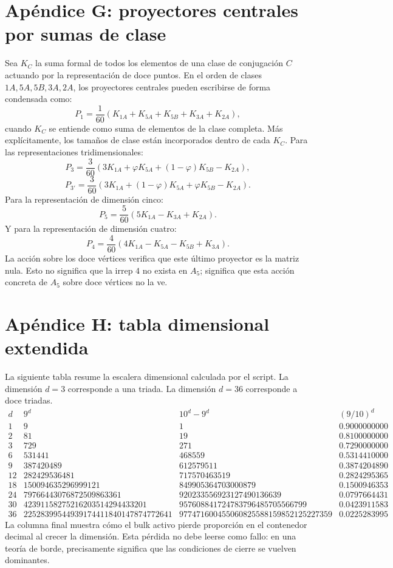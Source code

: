 \documentclass[11pt,a4paper]{article}
\begin{document}
\section{Apéndice G: proyectores centrales por sumas de clase}
Sea $K_C$ la suma formal de todos los elementos de una clase de conjugación $C$ actuando por la representación de doce puntos. En el orden de clases $1A,5A,5B,3A,2A$, los proyectores centrales pueden escribirse de forma condensada como:
\[
P_1=\frac1{60}(K_{1A}+K_{5A}+K_{5B}+K_{3A}+K_{2A}),
\]
cuando $K_C$ se entiende como suma de elementos de la clase completa. Más explícitamente, los tamaños de clase están incorporados dentro de cada $K_C$.
Para las representaciones tridimensionales:
\[
P_3=\frac3{60}\left(3K_{1A}+\varphi K_{5A}+(1-\varphi)K_{5B}-K_{2A}\right),
\]
\[
P_{3'}=\frac3{60}\left(3K_{1A}+(1-\varphi)K_{5A}+\varphi K_{5B}-K_{2A}\right).
\]
Para la representación de dimensión cinco:
\[
P_5=\frac5{60}\left(5K_{1A}-K_{3A}+K_{2A}\right).
\]
Y para la representación de dimensión cuatro:
\[
P_4=\frac4{60}\left(4K_{1A}-K_{5A}-K_{5B}+K_{3A}\right).
\]
La acción sobre los doce vértices verifica que este último proyector es la matriz nula. Esto no significa que la irrep $4$ no exista en $A_5$; significa que esta acción concreta de $A_5$ sobre doce vértices no la ve.

\section{Apéndice H: tabla dimensional extendida}
La siguiente tabla resume la escalera dimensional calculada por el script. La dimensión $d=3$ corresponde a una triada. La dimensión $d=36$ corresponde a doce triadas.
\[
\begin{array}{r|r|r|r}
 d & 9^d & 10^d-9^d & (9/10)^d\\
\hline
 1 & 9 & 1 & 0.9000000000\\
 2 & 81 & 19 & 0.8100000000\\
 3 & 729 & 271 & 0.7290000000\\
 6 & 531441 & 468559 & 0.5314410000\\
 9 & 387420489 & 612579511 & 0.3874204890\\
 12 & 282429536481 & 717570463519 & 0.2824295365\\
 18 & 150094635296999121 & 849905364703000879 & 0.1500946353\\
 24 & 79766443076872509863361 & 920233556923127490136639 & 0.0797664431\\
 30 & 42391158275216203514294433201 & 957608841724783796485705566799 & 0.0423911583\\
 36 & 22528399544939174411840147874772641 & 977471600455060825588159852125227359 & 0.0225283995
\end{array}
\]
La columna final muestra cómo el bulk activo pierde proporción en el contenedor decimal al crecer la dimensión. Esta pérdida no debe leerse como fallo: en una teoría de borde, precisamente significa que las condiciones de cierre se vuelven dominantes.
\end{document}
